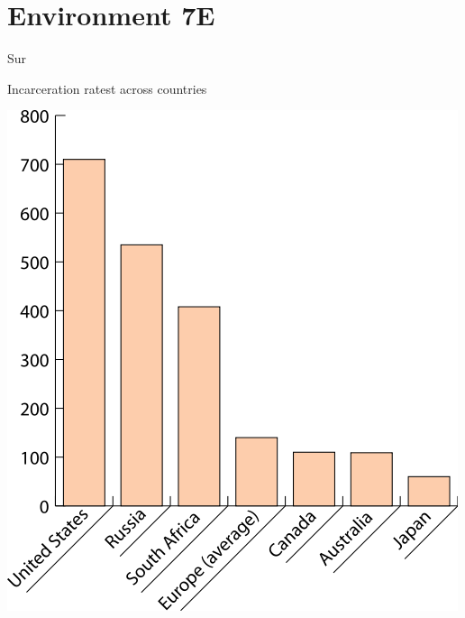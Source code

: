 \section{Environment 7E}

\begin{chart}{S}{ur}
\caption{Incarceration ratest across countries}
\label{chart:incarceration}
\includegraphics[width=\chartwidth,height=\chartheight]{incarceration}  
\end{chart}

